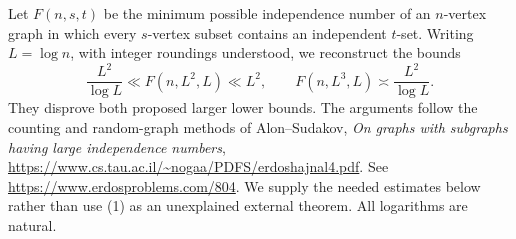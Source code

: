 Let \(F(n,s,t)\) be the minimum possible independence number
of an \(n\)-vertex graph in which every \(s\)-vertex subset
contains an independent \(t\)-set.
Writing \(L=\log n\), with integer roundings understood,
we reconstruct the bounds
\[
 \frac{L^2}{\log L}\ll F(n,L^2,L)\ll L^2,\qquad
 F(n,L^3,L)\asymp\frac{L^2}{\log L}.                            \tag{1}
\]
They disprove both proposed larger lower bounds.
The arguments follow the counting and random-graph methods
of Alon--Sudakov,
\emph{On graphs with subgraphs having large independence numbers},
\url{https://www.cs.tau.ac.il/~nogaa/PDFS/erdoshajnal4.pdf}.
See \url{https://www.erdosproblems.com/804}.
We supply the needed estimates below rather than use (1)
as an unexplained external theorem. All logarithms are natural.
